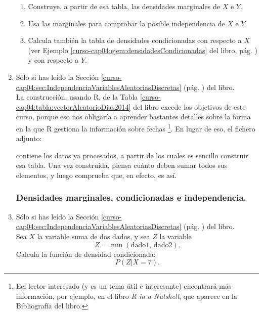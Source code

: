 \documentclass[10pt,a4paper]{article}\usepackage[]{graphicx}\usepackage[]{color}
\newcounter {cont01}
\begin{document}
\begin{enumerate}
\begin{enumerate}
        \item Construye, a partir de esa tabla, las densidades marginales de $X$ e $Y$.

        \item Usa las marginales para comprobar la posible independencia de $X$ e $Y$.

        \item Calcula también la tabla de densidades condicionadas con respecto a $X$ (ver Ejemplo \ref{curso-cap04:ejem:densidadesCondicionadas} del libro, pág. \pageref{curso-cap04:ejem:densidadesCondicionadas}) y con respecto a $Y$.
      \end{enumerate}

  \item Sólo si has leído la Sección \ref{curso-cap04:sec:IndependenciaVariablesAleatoriasDiscretas} (pág. \pageref{curso-cap04:sec:IndependenciaVariablesAleatoriasDiscretas}) del libro.\\

La construcción, usando R, de la Tabla \ref{curso-cap04:tabla:vectorAleatorioDias2014} del libro excede los objetivos de este curso, porque eso nos obligaría a aprender bastantes detalles sobre la forma en la que R gestiona la información sobre fechas \footnote{Eel lector interesado (y es un tema útil e interesante) encontrará más información, por ejemplo, en el libro {\em R in a Nutshell}, que aparece en la Bibliografía del libro.}. En lugar de eso, el fichero adjunto:
      \begin{center}
      \end{center}
contiene los datos ya procesados, a partir de los cuales es sencillo construir esa tabla. Una vez construida, piensa cuánto deben sumar todos sus elementos, y luego comprueba que, en  efecto, es así.


\subsubsection*{Densidades marginales, condicionadas e independencia.}

  \item Sólo si has leído la Sección \ref{curso-cap04:sec:IndependenciaVariablesAleatoriasDiscretas} (pág. \pageref{curso-cap04:sec:IndependenciaVariablesAleatoriasDiscretas}) del libro.\\ Sea $X$ la variable suma de dos dados, y sea $Z$ la variable
      \[Z=\min(\mbox{dado1, dado2}).\]
      Calcula la función de densidad condicionada:
      \[P(Z|X=7).\]

\end{enumerate}
\end{document}
